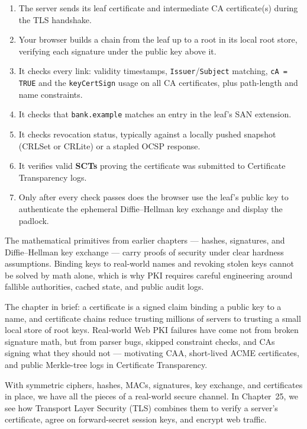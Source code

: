 \begin{enumerate}
\item The server sends its leaf certificate and intermediate CA certificate(s) during the TLS handshake.
\item Your browser builds a chain from the leaf up to a root in its local root store, verifying each signature under the public key above it.
\item It checks every link: validity timestamps, \texttt{Issuer}/\allowbreak\texttt{Subject} matching, \texttt{cA = TRUE} and the \texttt{keyCertSign} usage on all CA certificates, plus path-length and name constraints.
\item It checks that \texttt{bank.example} matches an entry in the leaf's SAN extension.
\item It checks revocation status, typically against a locally pushed snapshot (CRLSet or CRLite) or a stapled OCSP response.
\item It verifies valid \textbf{SCTs} proving the certificate was submitted to Certificate Transparency logs.
\item Only after every check passes does the browser use the leaf's public key to authenticate the ephemeral Diffie--Hellman key exchange and display the padlock.
\end{enumerate}

The mathematical primitives from earlier chapters --- hashes, signatures, and Diffie--Hellman key exchange --- carry proofs of security under clear hardness assumptions. Binding keys to real-world names and revoking stolen keys cannot be solved by math alone, which is why PKI requires careful engineering around fallible authorities, cached state, and public audit logs.

\begin{recoverybox}
The chapter in brief: a certificate is a signed claim binding a public key to a name, and certificate chains reduce trusting millions of servers to trusting a small local store of root keys. Real-world Web PKI failures have come not from broken signature math, but from parser bugs, skipped constraint checks, and CAs signing what they should not --- motivating CAA, short-lived ACME certificates, and public Merkle-tree logs in Certificate Transparency.
\end{recoverybox}

With symmetric ciphers, hashes, MACs, signatures, key exchange, and certificates in place, we have all the pieces of a real-world secure channel. In Chapter~25, we see how Transport Layer Security (TLS) combines them to verify a server's certificate, agree on forward-secret session keys, and encrypt web traffic.

